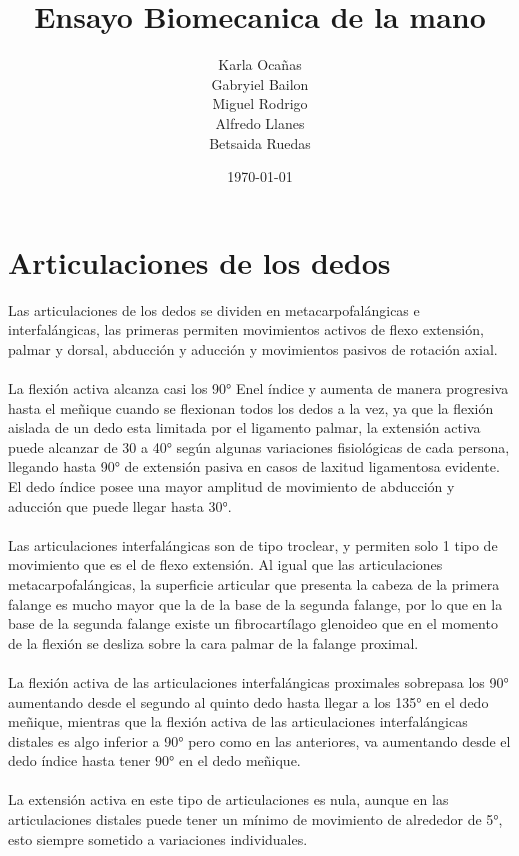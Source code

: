 \documentclass{article}
\author{Karla Ocañas \\ Gabryiel Bailon \\ Miguel Rodrigo \\ Alfredo Llanes \\ Betsaida Ruedas} %
\title{Ensayo Biomecanica de la mano} %
\date{\today}
\begin{document}

\maketitle %

\section{Articulaciones de los dedos}\label{intro} %
Las articulaciones de los dedos se dividen en metacarpofalángicas e interfalángicas, las primeras permiten movimientos activos de flexo extensión, palmar y dorsal, abducción y aducción y movimientos pasivos de rotación axial.\\
\\
La flexión activa alcanza casi los 90° Enel índice y aumenta de manera progresiva hasta el meñique cuando se flexionan todos los dedos a la vez, ya que la flexión aislada de un dedo esta limitada por el ligamento palmar, la extensión activa puede alcanzar de 30 a 40° según algunas variaciones fisiológicas de cada persona, llegando hasta 90° de extensión pasiva en casos de laxitud ligamentosa evidente. El dedo índice posee una mayor amplitud de movimiento de abducción y aducción que puede llegar hasta 30°.\\
\\
Las articulaciones interfalángicas son de tipo troclear, y permiten solo 1 tipo de movimiento que es el de flexo extensión. Al igual que las articulaciones metacarpofalángicas, la superficie articular que presenta la cabeza de la primera falange es mucho mayor que la de la base de la segunda falange, por lo que en la base de la segunda falange existe un fibrocartílago glenoideo que en el momento de la flexión se desliza sobre la cara palmar de la falange proximal.\\
\\
La flexión activa de las articulaciones interfalángicas proximales sobrepasa los 90° aumentando desde el segundo al quinto dedo hasta llegar a los 135° en el dedo meñique, mientras que la flexión activa de las articulaciones interfalángicas distales es algo inferior a 90° pero como en las anteriores, va aumentando desde el dedo índice hasta tener 90° en el dedo meñique.\\
\\
La extensión activa en este tipo de articulaciones es nula, aunque en las articulaciones distales puede tener un mínimo de movimiento de alrededor de 5°, esto siempre sometido a variaciones individuales.
\end{document}
